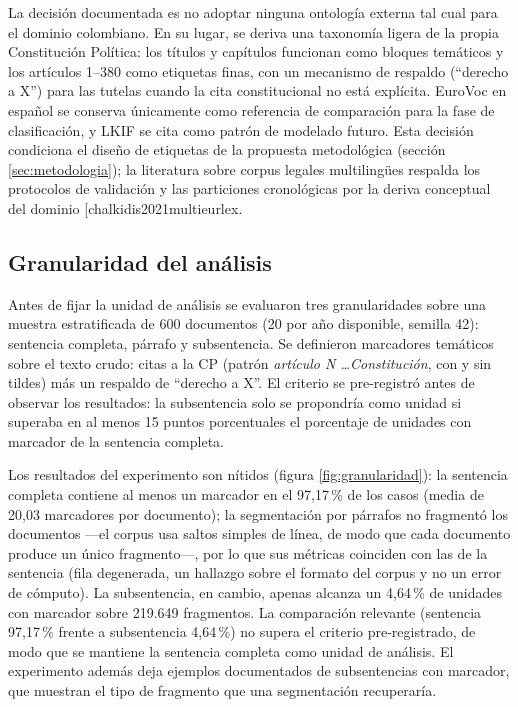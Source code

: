 \documentclass[11pt]{tg_usta}
\makeatletter
\renewcommand{\cite}{\@ifnextchar[{\@tempswatrue\@citex}{\@tempswafalse\@citex[]}}
\makeatother
\begin{document}
La decisión documentada es no adoptar ninguna ontología externa tal cual para el dominio colombiano. En su lugar, se deriva una taxonomía ligera de la propia Constitución Política: los títulos y capítulos funcionan como bloques temáticos y los artículos 1--380 como etiquetas finas, con un mecanismo de respaldo (``derecho a X'') para las tutelas cuando la cita constitucional no está explícita. EuroVoc en español se conserva únicamente como referencia de comparación para la fase de clasificación, y LKIF se cita como patrón de modelado futuro. Esta decisión condiciona el diseño de etiquetas de la propuesta metodológica (sección \ref{sec:metodologia}); la literatura sobre corpus legales multilingües respalda los protocolos de validación y las particiones cronológicas por la deriva conceptual del dominio \cite{chalkidis2021multieurlex}.

\subsection{Granularidad del análisis}
\label{sec:granularidad}
Antes de fijar la unidad de análisis se evaluaron tres granularidades sobre una muestra estratificada de 600 documentos (20 por año disponible, semilla 42): sentencia completa, párrafo y subsentencia. Se definieron marcadores temáticos sobre el texto crudo: citas a la CP (patrón \emph{artículo N \ldots Constitución}, con y sin tildes) más un respaldo de ``derecho a X''. El criterio se pre-registró antes de observar los resultados: la subsentencia solo se propondría como unidad si superaba en al menos 15 puntos porcentuales el porcentaje de unidades con marcador de la sentencia completa.

Los resultados del experimento son nítidos (figura \ref{fig:granularidad}): la sentencia completa contiene al menos un marcador en el 97,17\,\% de los casos (media de 20,03 marcadores por documento); la segmentación por párrafos no fragmentó los documentos ---el corpus usa saltos simples de línea, de modo que cada documento produce un único fragmento---, por lo que sus métricas coinciden con las de la sentencia (fila degenerada, un hallazgo sobre el formato del corpus y no un error de cómputo). La subsentencia, en cambio, apenas alcanza un 4,64\,\% de unidades con marcador sobre 219.649 fragmentos. La comparación relevante (sentencia 97,17\,\% frente a subsentencia 4,64\,\%) no supera el criterio pre-registrado, de modo que se mantiene la sentencia completa como unidad de análisis. El experimento además deja ejemplos documentados de subsentencias con marcador, que muestran el tipo de fragmento que una segmentación recuperaría.
\end{document}
